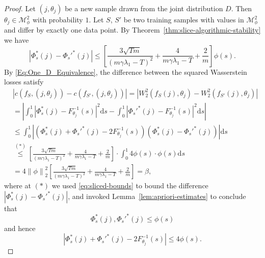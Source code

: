 \documentclass[letterpaper]{article} %
\begin{document}
\begin{proof}
  Let $\left( j,\theta_j \right)$ be a new sample drawn from the joint distribution $D$. Then $\theta_j\in\mathcal{M}_{\phi}^2$ with probability $1$. Let $S$, $S'$ be two training samples with values in $\mathcal{M}_{\phi}^2$ and differ by exactly one data point. By Theorem~\ref{thm:slice-algorithmic-stability} we have
  \begin{equation}
    \label{eq:sliced-bounds}
    \left| \Phi_s^{*} \left( j \right) -\Phi_s'^{*} \left( j \right) \right| \leq \left[\frac{3\sqrt{Tm}}{\left( m\gamma\lambda_1-T \right)^2}+\frac{4}{m\gamma\lambda_1-T}+\frac{2}{m}\right]\phi \left( s \right).
  \end{equation}
By \eqref{Eq:One_D_Equivalence}, the difference between the squared Wasserstein losses satisfy
  \begin{equation*}
    \begin{aligned}
      &\left| c \left( f_S, \left( j,\theta_j \right) \right) - c \left( f_{S'}, \left( j,\theta_j \right) \right) \right|=\left| W_2^2 \left( f_S \left( j \right),\theta_j \right) - W_2^2 \left( f_{S'} \left( j \right),\theta_j \right) \right|\\
      &=\left| \int_0^1 \left| \Phi_s^{*} \left( j \right)-F_{\theta_j}^{-1}\left( s \right) \right|^2\mathrm{d}s - \int_0^1 \left| \Phi_s'^{*} \left( j \right)-F_{\theta_j}^{-1}\left( s \right) \right|^2\mathrm{d}s \right|\\
      &\leq \int_0^1 \left| \left( \Phi_s^{*} \left( j \right)+\Phi_s'^{*} \left( j \right)-2F_{\theta_j}^{-1}\left( s \right) \right)\left( \Phi_s^{*} \left( j \right) -\Phi_s'^{*} \left( j \right) \right) \right| \mathrm{d}s\\
      &\stackrel{\left( * \right)}{\leq} \left[\frac{3\sqrt{Tm}}{\left( m\gamma\lambda_1-T \right)^2}+\frac{4}{m\gamma\lambda_1-T}+\frac{2}{m}\right]\cdot \int_0^1 4\phi \left( s \right)\cdot \phi \left( s \right)\mathrm{d}s\\
      &=4\left\| \phi \right\|_2^2\left[\frac{3\sqrt{Tm}}{\left( m\gamma\lambda_1-T \right)^2}+\frac{4}{m\gamma\lambda_1-T}+\frac{2}{m}\right]=\beta,
    \end{aligned}
  \end{equation*}
  where at $\left( * \right)$ we used \eqref{eq:sliced-bounds} to bound the difference $\left| \Phi_s^{*} \left( j \right) -\Phi_s'^{*} \left( j \right) \right|$, and invoked Lemma~\ref{lem:apriori-estimates} to conclude that
  \begin{equation*}
    \Phi_s^{*}\left( j \right),\Phi_s'^{*}\left( j \right) \leq \phi \left( s \right)
  \end{equation*}
  and hence
  \begin{equation*}
    \left| \Phi_s^{*} \left( j \right)+\Phi_s'^{*} \left( j \right)-2F_{\theta_j}^{-1}\left( s \right) \right|\leq 4\phi \left( s \right).
  \end{equation*}
\end{proof}
\end{document}
